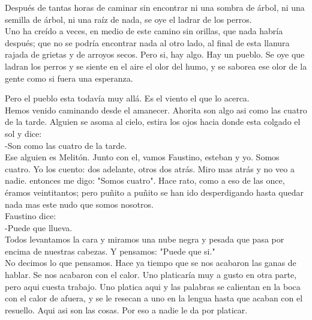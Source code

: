 \documentclass{article}
\title{}
\author{Juárez Torres Carlos Alberto}
\theoremstyle{mytheoremstyle}
\theoremstyle{mytheoremstyle}
\theoremstyle{myproblemstyle}
\begin{document}
\maketitle

Después de tantas horas de caminar sin encontrar ni una sombra de árbol, ni una semilla de  árbol, ni una raíz de nada, se oye el ladrar de los perros. \\

Uno ha creído a veces, en medio de este camino sin orillas, que nada habría después; que no se podría encontrar nada al otro lado, al final de esta llanura rajada de grietas y de arroyos  secos. Pero si, hay algo. Hay un pueblo. Se oye que ladran los perros y se siente en el aire el  olor del humo, y se saborea ese olor de la gente como si fuera una esperanza.

Pero el pueblo esta todavía muy allá. Es el viento el que lo acerca.\\

Hemos venido caminando desde el amanecer. Ahorita son algo asi como las cuatro de la tarde. Alguien se asoma al cielo, estira los ojos hacia donde esta colgado el sol y dice:\\

-Son como las cuatro de la tarde.\\

Ese alguien es Melitón. Junto con el, vamos Faustino, esteban y yo. Somos cuatro. Yo los  cuento: dos adelante, otros dos atrás. Miro mas atrás y no veo a nadie. entonces me digo: "Somos cuatro". Hace rato, como a eso de las once, éramos veintitantos; pero puñito a puñito se han ido desperdigando hasta quedar nada mas este nudo que somos nosotros.\\

Faustino dice:\\


-Puede que llueva.\\

Todos levantamos la cara y miramos una nube negra y pesada que pasa por encima de  nuestras cabezas. Y pensamos: "Puede que si."\\

No decimos lo que pensamos. Hace ya tiempo que se nos acabaron las ganas de hablar. Se nos acabaron con el calor. Uno platicaría muy a gusto en otra parte, pero aqui cuesta trabajo. Uno platica aqui y las palabras se calientan en la boca con el calor de afuera, y se le resecan a uno en la lengua hasta que acaban con el resuello. Aqui asi son las cosas. Por eso a nadie le  da por platicar.\\
\end{document}
